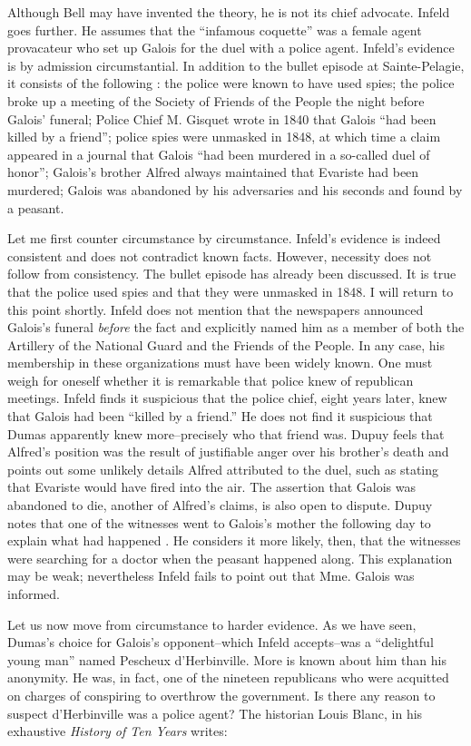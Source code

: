 \documentclass[12pt]{article}
\begin{document}
Although Bell may have invented the theory, he is not its chief advocate. Infeld goes further. He assumes that the ``infamous coquette'' was a female agent provacateur who set up Galois for the duel with a police agent. Infeld's evidence is by admission circumstantial. In addition to the bullet episode at Sainte-Pelagie, it consists of the following \cite{81}: the police were known to have used spies; the police broke up a meeting of the Society of Friends of the People the night before Galois' funeral; Police Chief M. Gisquet wrote in 1840 that Galois ``had been killed by a friend''; police spies were unmasked in 1848, at which time a claim appeared in a journal that Galois ``had been murdered in a so-called duel of honor''; Galois's brother Alfred always maintained that Evariste had been murdered; Galois was abandoned by his adversaries and his seconds and found by a peasant.

Let me first counter circumstance by circumstance. Infeld's evidence is indeed consistent and does not contradict known facts. However, necessity does not follow from consistency. The bullet episode has already been discussed. It is true that the police used spies and that they were unmasked in 1848. I will return to this point shortly. Infeld does not mention that the newspapers announced Galois's funeral {\it before} the fact and explicitly named him as a member of both the Artillery of the National Guard and the Friends of the People. In any case, his membership in these organizations must have been widely known. One must weigh for oneself whether it is remarkable that police knew of republican meetings. Infeld finds it suspicious that the police chief, eight years later, knew that Galois had been ``killed by a friend.'' He does not find it suspicious that Dumas apparently knew more--precisely who that friend was. Dupuy feels that Alfred's position was the result of justifiable anger over his brother's death and points out some unlikely details Alfred attributed to the duel, such as stating that Evariste would have fired into the air. The assertion that Galois was abandoned to die, another of Alfred's claims, is also open to dispute. Dupuy notes that one of the witnesses went to Galois's mother the following day to explain what had happened \cite{82}. He considers it more likely, then, that the witnesses were searching for a doctor when the peasant happened along. This explanation may be weak; nevertheless Infeld fails to point out that Mme. Galois was informed.

Let us now move from circumstance to harder evidence. As we have seen, Dumas's choice for Galois's opponent--which Infeld accepts--was a ``delightful young man'' named Pescheux d'Herbinville. More is known about him than his anonymity. He was, in fact, one of the nineteen republicans who were acquitted on charges of conspiring to overthrow the government. Is there any reason to suspect d'Herbinville was a police agent? The historian Louis Blanc, in his exhaustive \emph{History of Ten Years} writes:
\end{document}
